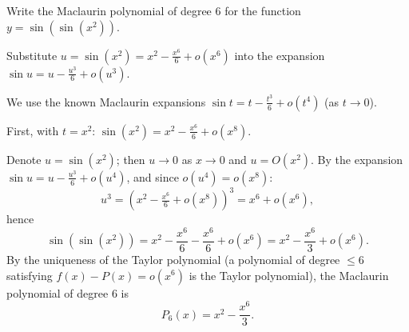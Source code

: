 
\begin{question}
Write the Maclaurin polynomial of degree 6 for the function $y=\sin\left(\sin(x^2)\right)$.
\end{question}

\begin{hint}
Substitute $u=\sin(x^2)=x^2-\frac{x^6}{6}+o(x^6)$ into the expansion $\sin u = u-\frac{u^3}{6}+o(u^3)$.
\end{hint}

\begin{solution}
We use the known Maclaurin expansions $\sin t = t - \frac{t^3}{6} + o(t^4)$ (as $t\to0$).

First, with $t=x^2$: $\sin(x^2) = x^2 - \frac{x^6}{6} + o(x^8)$.

Denote $u=\sin(x^2)$; then $u\to 0$ as $x\to0$ and $u = O(x^2)$. By the expansion $\sin u = u - \frac{u^3}{6} + o(u^4)$, and since $o(u^4)=o(x^8)$:
\[ u^3 = \left(x^2-\tfrac{x^6}{6}+o(x^8)\right)^3 = x^6 + o(x^6), \]
hence
\[ \sin(\sin(x^2)) = x^2 - \frac{x^6}{6} - \frac{x^6}{6} + o(x^6) = x^2 - \frac{x^6}{3} + o(x^6). \]
By the uniqueness of the Taylor polynomial (a polynomial of degree $\le 6$ satisfying $f(x)-P(x)=o(x^6)$ is the Taylor polynomial), the Maclaurin polynomial of degree 6 is
\[ P_6(x) = x^2 - \frac{x^6}{3}. \]
\end{solution}

